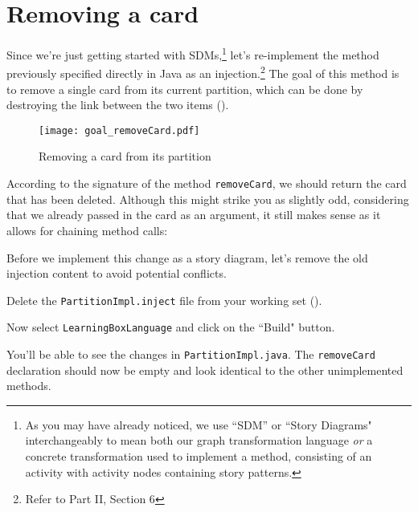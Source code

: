 \newpage
\genHeader
\section{Removing a card}
\hypertarget{sec:remCard}{}

Since we're just getting started with SDMs,\footnote{As you may have already noticed, we use ``SDM'' or ``Story Diagrams" interchangeably to mean both our graph
transformation language \emph{or} a concrete transformation used to implement a method, consisting of an activity with activity nodes containing story
patterns.} let's re-implement the method previously specified directly in Java as an injection.\footnote{Refer to Part II, Section 6} The goal of this method
is to remove a single card from its current partition, which can be done by destroying the link between the two items ().

\vspace{1cm}

\begin{figure}[htbp]
	\centering
    \texttt{[image: goal\_removeCard.pdf]}
	\caption{Removing a card from its partition}
	\label{fig:goal_removeCard}
\end{figure}
\FloatBarrier

\vspace{0.5cm}

According to the signature of the method \texttt{removeCard}, we should return the card that has been deleted. Although this might strike you as slightly odd,
considering that we already passed in the card as an argument, it still makes sense as it allows for chaining method calls:

Before we implement this change as a story diagram, let's remove the old injection content to avoid potential conflicts.

\begin{stepbystep}

\item Delete the \texttt{PartitionImpl.inject} file from your working set ().

\item Now select \texttt{LearningBoxLanguage} and click on the ``Build" button. 

\item You'll be able to see the changes in \texttt{PartitionImpl.java}. The \texttt{removeCard}
declaration should now be empty and look identical to the other unimplemented methods.

\end{stepbystep}

